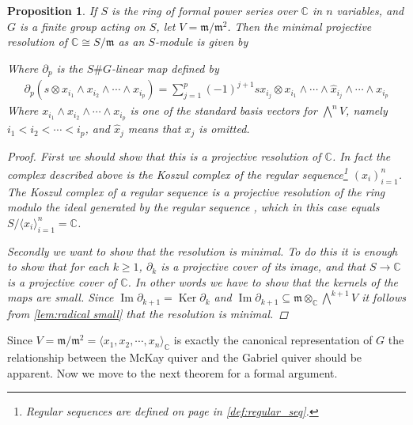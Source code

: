 \documentclass[11pt, a4paper, english]{article}
\newtheorem{prop}[theorem]{Proposition}
\theoremstyle{definition}
\newcommand{\C}{\mathbb{C}}
\DeclareMathOperator{\Image}{Im}
\DeclareMathOperator{\Ker}{Ker}
\begin{document}
\begin{prop}
If $S$ is the ring of formal power series over $\C$ in $n$ variables, and $G$ is a finite group acting on $S$, let $V=\mathfrak{m}/\mathfrak{m}^2$. Then the minimal projective resolution of $\C \cong S/\mathfrak{m}$ as an $S$-module is given by
\begin{center}
\end{center}
Where $\partial_p$ is the $S\#G$-linear map defined by
\begin{align*}
\partial_p(s \otimes x_{i_1} \wedge x_{i_2} \wedge \cdots \wedge x_{i_p}) = \sum_{j=1}^{p} (-1)^{j+1} sx_{i_j} \otimes x_{i_1} \wedge \cdots \wedge \hat{x}_{i_{j}} \wedge \cdots \wedge x_{i_{p}}
\end{align*}
Where $x_{i_1} \wedge x_{i_2} \wedge \cdots \wedge x_{i_p}$ is one of the standard basis vectors for $\bigwedge\limits^n V$, namely $i_1 < i_2 < \cdots < i_p$, and  $\hat{x}_j$ means that $x_j$ is omitted.

\begin{proof}
First we should show that this is a projective resolution of $\C$. In fact the complex described above is the Koszul complex of the regular sequence\footnote{Regular sequences are defined on page \pageref{def:regular_seq} in \cref{def:regular_seq}.} $(x_i)_{i=1}^n$. The Koszul complex of a regular sequence is a projective resolution of the ring modulo the ideal generated by the regular sequence \cite[\href{https://stacks.math.columbia.edu/tag/062F}{Tag 062F}]{stacks-project}, which in this case equals $S/\langle x_i \rangle_{i=1}^n = \C$.

Secondly we want to show that the resolution is minimal. To do this it is enough to show that for each $k \geq 1$, $\partial_k$ is a projective cover of its image, and that $S \to \C$ is a projective cover of $\C$. In other words we have to show that the kernels of the maps are small. Since $\Image \partial_{k+1} = \Ker \partial_k$ and $\Image \partial_{k+1} \subseteq \mathfrak{m} \otimes_\C \bigwedge\limits^{k+1}V$ it follows from \cref{lem:radical small} that the resolution is minimal.
\end{proof}
\end{prop}

Since $V = \mathfrak{m}/\mathfrak{m}^2 = \langle x_1, x_2, \cdots, x_n \rangle_\C$ is exactly the canonical representation of $G$ the relationship between the McKay quiver and the Gabriel quiver should be apparent. Now we move to the next theorem for a formal argument.
\end{document}
